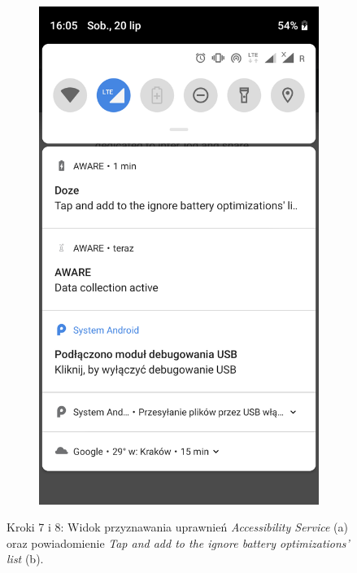 \begin{enumerate}
\begin{figure}[H]
\begin{subfigure}{0.35\textwidth}
			\includegraphics[scale=0.13]{dodatekA/3_8.png}
			\subcaption{\label{subfigure_b}}
		\end{subfigure}
		\caption{ Kroki 7 i 8: Widok przyznawania uprawnień \textit{Accessibility Service} (a) oraz powiadomienie \textit{Tap and add to the ignore battery optimizations' list} (b).}
	\end{figure}
	

\end{enumerate}
